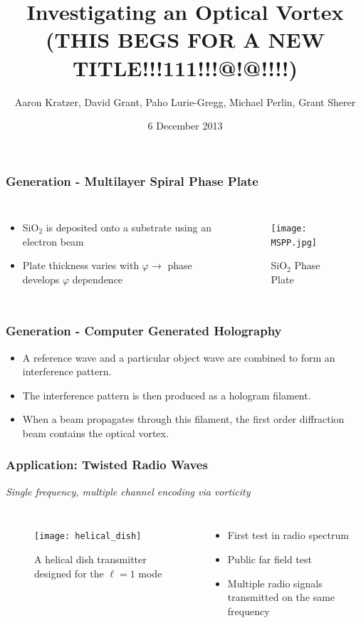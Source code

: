 \documentclass[xcolor=dvipsnames]{beamer}
\title{Investigating an Optical Vortex (THIS BEGS FOR A NEW TITLE!!!111!!!@!@!!!!)}
\author{Aaron Kratzer, David Grant, Paho Lurie-Gregg,
  Michael Perlin, Grant Sherer}
\date{6 December 2013}
\newenvironment{items}[1][]
{\begin{itemize}
    \ifthenelse{\isempty{#1}}
    {\setlength{\itemsep}{12pt}}{\setlength{\itemsep}{#1}}}
  {\end{itemize}}
\renewcommand{\phi}{\varphi} %
\begin{document}
\begin{frame}
  \maketitle
\end{frame}

\begin{frame}
	\frametitle{Generation - Multilayer Spiral Phase Plate}
  \begin{columns}[c]
    \begin{items}
    \item SiO$_2$ is deposited onto a substrate using an electron beam
    \item Plate thickness varies with $\phi\to$ phase
      develops $\phi$ dependence 
    \end{items}
    \begin{figure}
      \texttt{[image: MSPP.jpg]}
      \caption{SiO$_2$ Phase Plate}
      \label{MSPP}
    \end{figure}
  \end{columns}
\end{frame}

\begin{frame}
	\frametitle{Generation - Computer Generated Holography}
  \begin{items}
  \item A reference wave and a particular object wave are combined to
    form an interference pattern.
  \item The interference pattern is then produced as a hologram
    filament.
  \item When a beam propagates through this filament, the first order
    diffraction beam contains the optical vortex.
  \end{items}
\end{frame}

\begin{frame}
	\frametitle{Application: Twisted Radio Waves}
	\begin{center}
		\emph{Single frequency, multiple channel encoding via vorticity}
	\end{center}
  \begin{columns}[c]
    \begin{figure}
      \texttt{[image: helical\_dish]}
      \caption{A helical dish transmitter designed for the $\ell=1$
        mode}
      \label{pic:dish}
    \end{figure}
		\begin{items}
		\item First test in radio spectrum
		\item Public far field test
		\item Multiple radio signals transmitted on the same frequency
		\end{items}
	\end{columns}
\end{frame}
\end{document}
